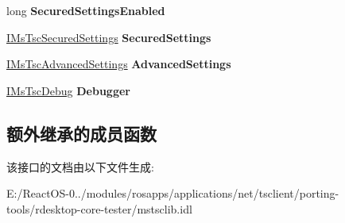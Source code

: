 \begin{DoxyCompactItemize}
long {\bfseries Secured\+Settings\+Enabled}
\item 
\mbox{\label{interface_m_s_t_s_c_lib_1_1_i_ms_tsc_ax_a2309d4f79e001a7b7831927f868e66db}} 
\hyperlink{interface_m_s_t_s_c_lib_1_1_i_ms_tsc_secured_settings}{I\+Ms\+Tsc\+Secured\+Settings} {\bfseries Secured\+Settings}
\item 
\mbox{\label{interface_m_s_t_s_c_lib_1_1_i_ms_tsc_ax_a06215fb33ea5cca26db329b94f5d018c}} 
\hyperlink{interface_m_s_t_s_c_lib_1_1_i_ms_tsc_advanced_settings}{I\+Ms\+Tsc\+Advanced\+Settings} {\bfseries Advanced\+Settings}
\item 
\mbox{\label{interface_m_s_t_s_c_lib_1_1_i_ms_tsc_ax_ad881ad8dcf46326e24a0f9a46343637e}} 
\hyperlink{interface_m_s_t_s_c_lib_1_1_i_ms_tsc_debug}{I\+Ms\+Tsc\+Debug} {\bfseries Debugger}
\end{DoxyCompactItemize}
\subsection*{额外继承的成员函数}


该接口的文档由以下文件生成\+:\begin{DoxyCompactItemize}
\item 
E\+:/\+React\+O\+S-\/0../modules/rosapps/applications/net/tsclient/porting-\/tools/rdesktop-\/core-\/tester/mstsclib.\+idl\end{DoxyCompactItemize}

